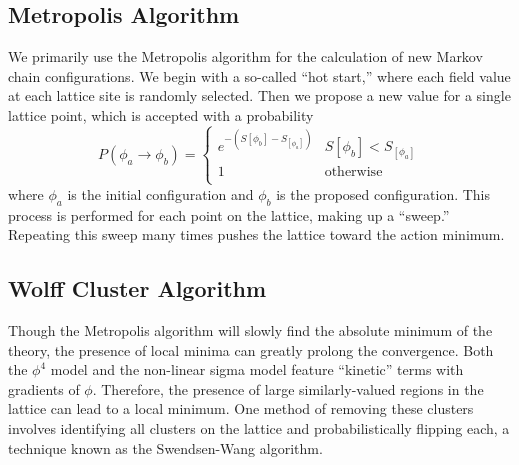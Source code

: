 \subsection{Metropolis Algorithm}
We primarily use the Metropolis algorithm for the calculation of new Markov chain configurations. We begin with a so-called ``hot start,'' where each field value at each lattice site is randomly selected. Then we propose a new value for a single lattice point, which is accepted with a probability
\begin{equation}
    P(\phi_a\rightarrow\phi_b) = \begin{cases} 
        e^{-(S[\phi_b] - S_[\phi_a])} & S[\phi_b] < S_[\phi_a] \\
        1 & \mathrm{otherwise} \\
   \end{cases}
\end{equation}
where $\phi_a$ is the initial configuration and $\phi_b$ is the proposed configuration. This process is performed for each point on the lattice, making up a ``sweep.'' Repeating this sweep many times pushes the lattice toward the action minimum.


\subsection{Wolff Cluster Algorithm}

Though the Metropolis algorithm will slowly find the absolute minimum of the theory, the presence of local minima can greatly prolong the convergence. Both the $\phi^4$ model and the non-linear sigma model feature ``kinetic'' terms with gradients of $\phi$. Therefore, the presence of large similarly-valued regions in the lattice can lead to a local minimum. One method of removing these clusters involves identifying all clusters on the lattice and probabilistically flipping each, a technique known as the Swendsen-Wang algorithm\cite{swendsen1987}. 

